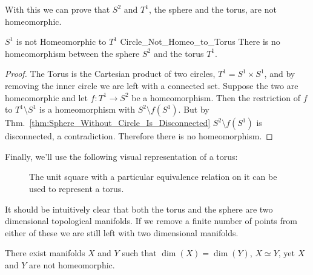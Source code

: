 \documentclass[crop=false,class=book,oneside]{standalone}                      %
\begin{document}
            With this we can prove that $S^{2}$ and $T^{1}$, the sphere and the
            torus, are not homeomorphic.
            \begin{ltheorem}{$S^{1}$ is not Homeomorphic to $T^{1}$}
                            {Circle_Not_Homeo_to_Torus}
                There is no homeomorphism between the sphere $S^{2}$ and
                the torus $T^{1}$.
            \end{ltheorem}
            \begin{proof}
                The Torus is the Cartesian product of two circles,
                $T^{1}=S^{1}\times{S}^{1}$, and by removing the inner circle we
                are left with a connected set. Suppose the two are homeomorphic
                and let $f:T^{1}\rightarrow{S}^{2}$ be a homeomorphism. Then the
                restriction of $f$ to $T^{1}\setminus{S}^{1}$ is a homeomorphism
                with $S^{2}\setminus{f}(S^{1})$. But by
                Thm.~\ref{thm:Sphere_Without_Circle_Is_Disconnected}
                $S^{2}\setminus{f}(S^{1})$ is disconnected, a contradiction.
                Therefore there is no homeomorphism.
            \end{proof}
            Finally, we'll use the following visual representation of a torus:
            \begin{figure}[H]
                \centering
                \captionsetup{type=figure}
                \resizebox{\textwidth}{!}{%
                }
                \caption[Plane Representation of a Torus]
                        {The unit square with a particular equivalence relation
                         on it can be used to represent a torus.}
                \label{fig:plane_representation_of_a_torus}
            \end{figure}
            It should be intuitively clear that both the torus and the sphere
            are two dimensional topological manifolds. If we remove a finite
            number of points from either of these we are still left with
            two dimensional manifolds.
            \begin{theorem}
                There exist manifolds $X$ and $Y$ such that
                $\dim(X)=\dim(Y)$, ${X}\simeq{Y}$,
                yet $X$ and $Y$ are not homeomorphic.
            \end{theorem}
\end{document}
